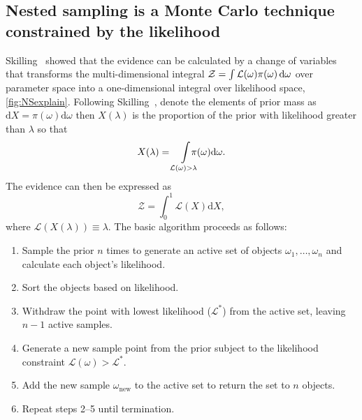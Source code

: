 \subsection{Nested sampling is a Monte Carlo technique constrained by the likelihood}
Skilling~\cite{Skilling2006, sivia2006} showed that the evidence can be calculated by a change of variables that transforms the multi-dimensional integral $\mathcal Z = \int\mathcal L(\omega) \pi(\omega) \mathop{}\!\mathrm{d} \omega$ over parameter space into a one-dimensional integral over likelihood space, \autoref{fig:NSexplain}.
Following Skilling~\cite{Skilling2006, sivia2006}, denote the elements of prior mass as $\mathrm{d} X = \pi(\omega)\mathrm{d} \omega$ then $X(\lambda)$ is the proportion of the prior with likelihood greater than $\lambda$ so that 
\begin{equation}
X(\lambda) = \int\limits_{\mathcal L(\omega) > \lambda} \hspace{-1em}\pi(\omega)\mathrm{d} \omega.
\end{equation}
The evidence can then be expressed as
\begin{equation}\label{1Dint}
\mathcal Z = \int_0^1 \mathcal L(X) \mathrm{d} X,
\end{equation}
where $\mathcal L(X(\lambda)) \equiv \lambda$.
The basic algorithm proceeds as follows:
\begin{enumerate}
\item Sample the prior $n$ times to generate an active set of objects ${\omega_1,\ldots,\omega_n}$ and calculate each object's likelihood.
\item Sort the objects based on likelihood.
\item Withdraw the point with lowest likelihood ($\mathcal L^*$) from the active set, leaving $n-1$ active samples.
\item Generate a new sample point from the prior subject to the likelihood constraint $\mathcal L(\omega) > \mathcal L^*$.
\item Add the new sample $\omega_{\mathrm {new}}$ to the active set to return the set to $n$ objects.
\item Repeat steps 2--5 until termination.
\end{enumerate}
